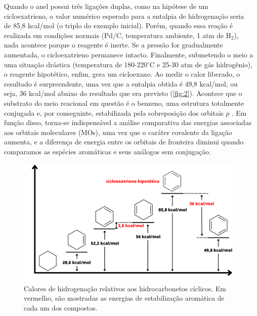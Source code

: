 Quando o anel possui três ligações duplas, como na hipótese de um cicloexatrieno, o valor numérico esperado para a entalpia de hidrogenação seria de 85,8 kcal/mol (o triplo do exemplo inicial). Porém, quando essa reação é realizada em condições normais (Pd/C, temperatura ambiente, 1 atm de H$_2$), nada acontece porque o reagente é inerte. Se a pressão for gradualmente aumentada, o cicloexatrieno permanece intacto. Finalmente, submetendo o meio a uma situação drástica (temperatura de 180-220$^\circ$C e 25-30 atm de gás hidrogênio), o reagente hipotético, enfim, gera um cicloexano. Ao medir o calor liberado, o resultado é surpreendente, uma vez que a entalpia obtida é 49,8 kcal/mol, ou seja, 36 kcal/mol abaixo do resultado que era previsto (\autoref{fig:2}). Acontece que o substrato do meio reacional em questão é o benzeno, uma estrutura totalmente conjugada e, por conseguinte, estabilizada pela sobreposição dos orbitais $p$ \autocite{Shaabani2008, Xu2021}. Em função disso, torna-se indispensável a análise comparativa das energias associadas aos orbitais moleculares (MOs), uma vez que o caráter covalente da ligação aumenta, e a diferença de energia entre os orbitais de fronteira diminui quando comparamos as espécies aromáticas e seus análogos sem conjugação.

\begin{figure}[htb]
	\caption{\label{fig:2} Calores de hidrogenação relativos aos hidrocarbonetos cíclicos. Em vermelho, são mostradas as energias de estabilização aromática de cada um dos compostos.}
	\begin{center}
		\includegraphics[width=1.0\textwidth]{images/fig2.png}
	\end{center}
\end{figure}


